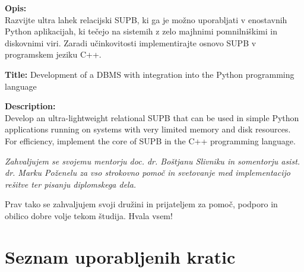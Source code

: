 \documentclass[a4paper,12pt,openright]{book}
\newcommand{\ttitleEn}{Development of a DBMS with integration into the Python programming language}
\newcommand{\clearemptydoublepage}{\newpage{\pagestyle{empty}\cleardoublepage}}
\begin{document}
\bigskip
\noindent\textbf{Opis:}\\
Razvijte ultra lahek relacijski SUPB, ki ga je možno uporabljati v enostavnih Python aplikacijah, ki tečejo na sistemih z zelo majhnimi pomnilniškimi in diskovnimi viri. Zaradi učinkovitosti implementirajte osnovo SUPB v programskem jeziku C++.

\bigskip
\noindent\textbf{Title:} \ttitleEn

\bigskip
\noindent\textbf{Description:}\\
Develop an ultra-lightweight relational SUPB that can be used in simple Python applications running on systems with very limited memory and disk resources. For efficiency, implement the core of SUPB in the C++ programming language.
\vfill



\vspace{2cm}

\clearemptydoublepage

\thispagestyle{empty}\mbox{}\vfill\null\it%
\noindent
Zahvaljujem se svojemu mentorju doc. dr. Boštjanu Slivniku in somentorju asist. dr. Marku Poženelu za vso strokovno pomoč in svetovanje med implementacijo rešitve ter pisanju diplomskega dela.

Prav tako se zahvaljujem svoji družini in prijateljem za pomoč, podporo in obilico dobre volje tekom študija.
\noindent
Hvala vsem!
\rm\normalfont

\clearemptydoublepage


\clearemptydoublepage


\setcounter{tocdepth}{2}
\pagestyle{empty}
\def\thepage{}%
\tableofcontents{}


\clearemptydoublepage


\chapter*{Seznam uporabljenih kratic}
\end{document}
